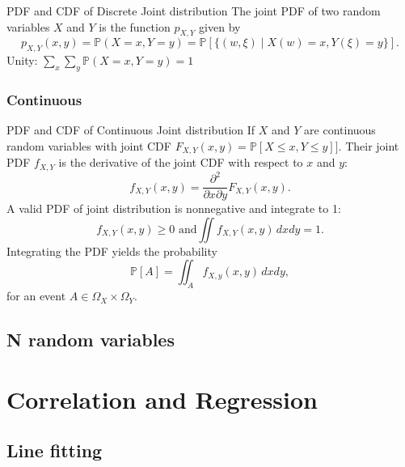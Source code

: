 \documentclass[11pt,a4paper,fleqn]{article}
\numberwithin{equation}{section}
\newcommand{\prob}{\mathbb{P}}
\newcommand{\samplespace}{\Omega}
\begin{document}
\begin{fact}{PDF and CDF of Discrete Joint distribution}{}
    The joint PDF of two random variables $X$ and $Y$ is the function $p_{X,Y}$ given by
    \begin{equation*}
        p_{X,Y}(x,y) = \prob(X=x,Y=y) = \prob[\{ (w,\xi) \mid X(w) =x, Y(\xi) = y\}].
    \end{equation*}
    Unity: $ \sum_x \sum_y \prob(X=x,Y=y) = 1$
\end{fact}

\subsubsection{Continuous}

\begin{fact}{PDF and CDF of Continuous Joint distribution}{}
    If $X$ and $Y$ are continuous random variables with joint CDF $F_{X,Y}(x,y)=\prob[X\le x,Y\le y]]$.
    Their joint PDF $f_{X,Y}$ is the derivative of the joint CDF with respect to $x$ and $y$:
    \begin{equation*}
        f_{X,Y}(x,y)=\frac{\partial^2}{\partial{x}\partial{y}}F_{X,Y}(x,y).
    \end{equation*}
    A valid PDF of joint distribution is nonnegative and integrate to 1:
    \begin{equation*}
        f_{X,Y}(x,y) \ge 0 \text{ and} \iint f_{X,Y}(x,y)\,dxdy=1.
    \end{equation*}
    Integrating the PDF yields the probability
    \begin{equation*}
        \prob[A]=\iint_{A}f_{X,y}(x,y)\,dxdy ,
    \end{equation*}
    for an event $A\in\samplespace_X\times\samplespace_Y$.
\end{fact}

\subsection{N random variables}


\section{Correlation and Regression}

\subsection{Line fitting}
\end{document}

